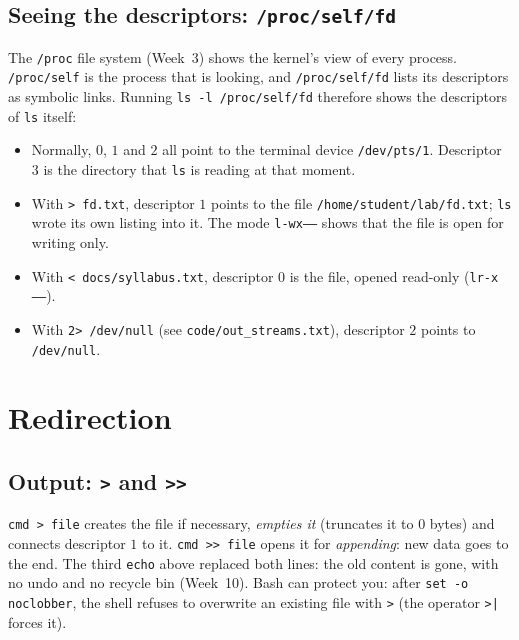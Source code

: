 \documentclass[11pt,a4paper]{article}
\newcommand{\cmd}[1]{\texttt{#1}}
\begin{document}
\subsection{Seeing the descriptors: \texttt{/proc/self/fd}}

The \texttt{/proc} file system (Week~3) shows the kernel's view of every process. \texttt{/proc/self} is the process that is looking, and \texttt{/proc/self/fd} lists its descriptors as symbolic links. Running \cmd{ls -l /proc/self/fd} therefore shows the descriptors of \cmd{ls} itself:



\begin{itemize}
  \item Normally, $0$, $1$ and $2$ all point to the terminal device \texttt{/dev/pts/1}. Descriptor $3$ is the directory that \cmd{ls} is reading at that moment.
  \item With \cmd{> fd.txt}, descriptor $1$ points to the file \texttt{/home/student/lab/fd.txt}; \cmd{ls} wrote its own listing into it. The mode \texttt{l-wx------} shows that the file is open for writing only.
  \item With \cmd{< docs/syllabus.txt}, descriptor $0$ is the file, opened read-only (\texttt{lr-x------}).
  \item With \cmd{2> /dev/null} (see \texttt{code/out\_streams.txt}), descriptor $2$ points to \texttt{/dev/null}.
\end{itemize}

\section{Redirection}
\label{sec:redir}

\subsection{Output: \texttt{>} and \texttt{>>}}



\cmd{cmd > file} creates the file if necessary, \emph{empties it} (truncates it to $0$ bytes) and connects descriptor $1$ to it. \cmd{cmd >> file} opens it for \emph{appending}: new data goes to the end. The third \cmd{echo} above replaced both lines: the old content is gone, with no undo and no recycle bin (Week~10). Bash can protect you: after \cmd{set -o noclobber}, the shell refuses to overwrite an existing file with \cmd{>} (the operator \cmd{>|} forces it).
\end{document}
